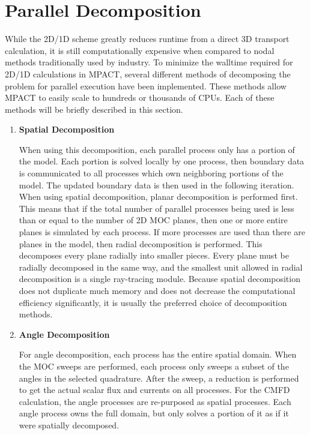 \section{Parallel Decomposition}

While the 2D/1D scheme greatly reduces runtime from a direct 3D transport calculation, it is still computationally expensive when compared to nodal methods traditionally used by industry.  To minimize the walltime required for 2D/1D calculations in MPACT, several different methods of decomposing the problem for parallel execution have been implemented.  These methods allow MPACT to easily scale to hundreds or thousands of CPUs.  Each of these methods will be briefly described in this section.

\begin{enumerate}[leftmargin=*]
\item \textbf{Spatial Decomposition}

When using this decomposition, each parallel process only has a portion of the model.  Each portion is solved locally by one process, then boundary data is communicated to all processes which own neighboring portions of the model.  The updated boundary data is then used in the following iteration.  When using spatial decomposition, planar decomposition is performed first.  This means that if the total number of parallel processes being used is less than or equal to the number of 2D MOC planes, then one or more entire planes is simulated by each process.  If more processes are used than there are planes in the model, then radial decomposition is performed.  This decomposes every plane radially into smaller pieces.  Every plane must be radially decomposed in the same way, and the smallest unit allowed in radial decomposition is a single ray-tracing module.  Because spatial decomposition does not duplicate much memory and does not decrease the computational efficiency significantly, it is usually the preferred choice of decomposition methods.

\item \textbf{Angle Decomposition}

For angle decomposition, each process has the entire spatial domain.  When the MOC sweeps are performed, each process only sweeps a subset of the angles in the selected quadrature.  After the sweep, a reduction is performed to get the actual scalar flux and currents on all processes.  For the CMFD calculation, the angle processes are re-purposed as spatial processes.  Each angle process owns the full domain, but only solves a portion of it as if it were spatially decomposed.


\end{enumerate}
